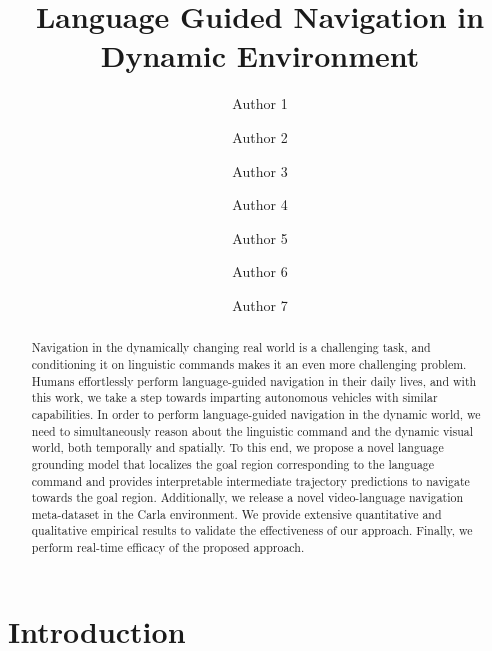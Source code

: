 \documentclass[letterpaper, 10 pt, conference]{ieeeconf}  %
\begin{document}
\title{\LARGE \bf Language Guided Navigation in Dynamic Environment\\
}

\author{{Author 1 }
\and
{ Author 2 }
\and
{ Author 3 }
\and
{Author 4 }
\and
{ Author 5} 
\and
{ Author 6} 
\and
{ Author 7} 
} 


\maketitle

\begin{abstract}
Navigation in the dynamically changing real world is a challenging task, and conditioning it on linguistic commands makes it an even more challenging problem. Humans effortlessly perform language-guided navigation in their daily lives, and with this work, we take a step towards imparting autonomous vehicles with similar capabilities. In order to perform language-guided navigation in the dynamic world, we need to simultaneously reason about the linguistic command and the dynamic visual world, both temporally and spatially. To this end, we propose a novel language grounding model that localizes the goal region corresponding to the language command and provides interpretable intermediate trajectory predictions to navigate towards the goal region. Additionally, we release a novel video-language navigation meta-dataset in the Carla environment. We provide extensive quantitative and qualitative empirical results to validate the effectiveness of our approach. Finally, we perform real-time efficacy of the proposed approach.

\end{abstract}

\section{Introduction}
\end{document}
